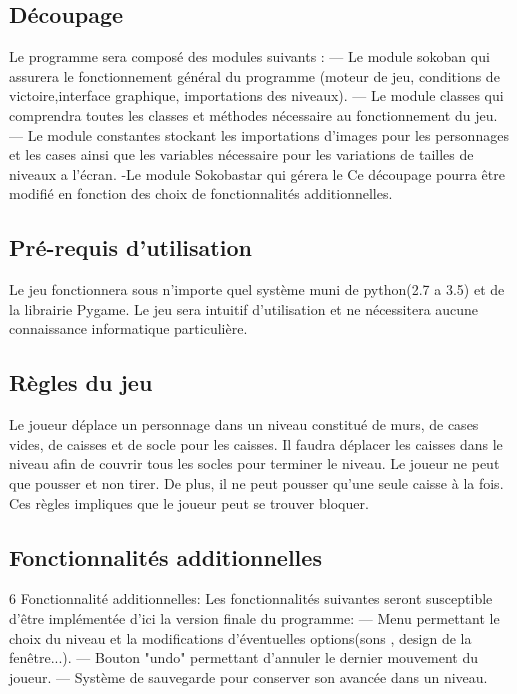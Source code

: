 \documentclass{article}
\begin{document}
		\subsection{Découpage}
		Le programme sera composé des modules suivants : \newline
— Le module sokoban qui assurera le fonctionnement général du programme
(moteur de jeu, conditions de victoire,interface graphique, importations
des niveaux). \newline
— Le module classes qui comprendra toutes les classes et méthodes nécessaire
au fonctionnement du jeu. \newline
— Le module constantes stockant les importations d’images pour les personnages
et les cases ainsi que les variables nécessaire pour les variations
de tailles de niveaux a l’écran. \newline
-Le module Sokobastar qui gérera le 
Ce découpage pourra être modifié en fonction des choix de fonctionnalités additionnelles. \newline
		\subsection{Pré-requis d'utilisation}
		Le jeu fonctionnera sous n’importe quel système muni de python(2.7 a 3.5) et de la librairie Pygame. Le jeu sera intuitif d’utilisation et ne nécessitera aucune connaissance informatique particulière.
		\subsection{Règles du jeu}
		Le joueur déplace un personnage dans un niveau constitué de murs, de cases
vides, de caisses et de socle pour les caisses. Il faudra déplacer les caisses dans
le niveau afin de couvrir tous les socles pour terminer le niveau. Le joueur ne peut que pousser et non tirer. De plus, il ne peut pousser qu’une seule caisse à la fois. Ces règles impliques que le joueur peut se trouver bloquer.
		\subsection{Fonctionnalités additionnelles}
			6 Fonctionnalité additionnelles: \newline
Les fonctionnalités suivantes seront susceptible d’être implémentée d’ici la
version finale du programme: \newline
— Menu permettant le choix du niveau et la modifications d’éventuelles
options(sons , design de la fenêtre...). \newline
— Bouton "undo" permettant d’annuler le dernier mouvement du joueur. \newline
— Système de sauvegarde pour conserver son avancée dans un niveau. \newline
\end{document}
